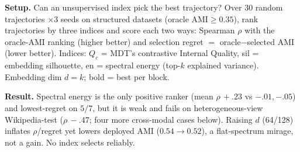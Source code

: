 \begin{table}[H]\centering\scriptsize\setlength{\tabcolsep}{2.6pt}
\caption{Unsupervised MDT trajectory selection (Scenario 4).}
\label{tab:iq}
\end{table}

\noindent\textbf{Setup.} Can an unsupervised index pick the best trajectory? Over $30$ random
trajectories $\times 3$ seeds on structured datasets (oracle AMI$\ge0.35$), rank trajectories by three
indices and score each two ways: Spearman $\rho$ with the oracle-AMI ranking (higher better) and
selection regret $=$ oracle$-$selected AMI (lower better). Indices: $Q_c$ = MDT's contrastive
Internal Quality, sil = embedding silhouette, en = spectral energy (top-$k$ explained
variance). Embedding dim $d{=}k$; bold = best per block.

\noindent\textbf{Result.} Spectral energy is the only positive ranker (mean $\rho\,{+}.23$ vs
${-}.01,{-}.05$) and lowest-regret on $5/7$, but it is weak and fails on heterogeneous-view Wikipedia-test
($\rho\,{-}.47$; four more cross-modal cases below). Raising $d$ (64/128) inflates $\rho$/regret yet
lowers deployed AMI ($0.54\!\to\!0.52$), a flat-spectrum mirage, not a gain. No index selects
reliably.

